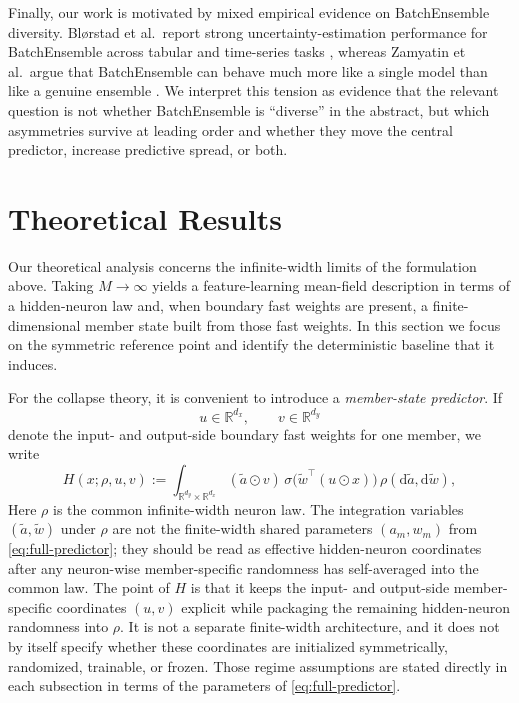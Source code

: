 \documentclass{article}
\newcommand{\R}{\mathbb{R}}
\begin{document}
Finally, our work is motivated by mixed empirical evidence on BatchEnsemble diversity. Bl\o rstad et al.\ report strong uncertainty-estimation performance for BatchEnsemble across tabular and time-series tasks \cite{blorstad2026}, whereas Zamyatin et al.\ argue that BatchEnsemble can behave much more like a single model than like a genuine ensemble \cite{zamyatin2026}. We interpret this tension as evidence that the relevant question is not whether BatchEnsemble is ``diverse'' in the abstract, but which asymmetries survive at leading order and whether they move the central predictor, increase predictive spread, or both.

\section{Theoretical Results}

Our theoretical analysis concerns the infinite-width limits of the formulation above. Taking $M\to\infty$ yields a feature-learning mean-field description in terms of a hidden-neuron law and, when boundary fast weights are present, a finite-dimensional member state built from those fast weights. In this section we focus on the symmetric reference point and identify the deterministic baseline that it induces.

For the collapse theory, it is convenient to introduce a \emph{member-state predictor}. If
\[
u\in\R^{d_x},
\qquad
v\in\R^{d_y}
\]
denote the input- and output-side boundary fast weights for one member, we write
\begin{equation}
H(x;\rho,u,v)
:=
\int_{\R^{d_y}\times\R^{d_x}}
(\tilde a\odot v)\,
\sigma\!\bigl(\tilde w^\top(u\odot x)\bigr)\,
\rho(\mathrm{d}\tilde a,\mathrm{d}\tilde w),
\label{eq:member-state-predictor}
\end{equation}
Here $\rho$ is the common infinite-width neuron law. The integration variables $(\tilde a,\tilde w)$ under $\rho$ are not the finite-width shared parameters $(a_m,w_m)$ from \eqref{eq:full-predictor}; they should be read as effective hidden-neuron coordinates after any neuron-wise member-specific randomness has self-averaged into the common law. The point of $H$ is that it keeps the input- and output-side member-specific coordinates $(u,v)$ explicit while packaging the remaining hidden-neuron randomness into $\rho$. It is not a separate finite-width architecture, and it does not by itself specify whether these coordinates are initialized symmetrically, randomized, trainable, or frozen. Those regime assumptions are stated directly in each subsection in terms of the parameters of \eqref{eq:full-predictor}.
\end{document}
